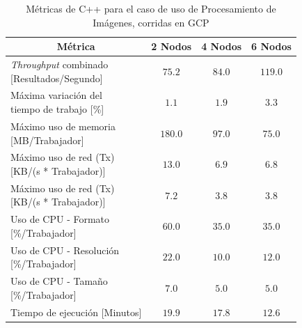 \documentclass[11pt]{article}
\providecommand{\row}[1]{\parbox{150pt}{\setlength{\baselineskip}{0.2\baselineskip}\strut#1\strut}}
\newcommand{\ipcap}[2]{\caption{Métricas de #1 para el caso de uso de Procesamiento de Imágenes, corridas en #2}}
\newcommand{\english}[1]{\textit{#1}}
\begin{document}
\begin{table}[H]
\centering
\begin{tabular}{|l|c|c|c|}
\hline
\multicolumn{1}{|c|}{Métrica} & 2 Nodos & 4 Nodos & 6 Nodos \\ \hline
\row{\english{Throughput} combinado\\{[Resultados/Segundo]}} & $75.2$ & $84.0$ & $119.0$ \\ \hline
\row{Máxima variación del \\ tiempo de trabajo {[}\%{]}} & $1.1$ & $1.9$ & $3.3$ \\ \hline
\row{Máximo uso de memoria \\ {[MB/Trabajador]}} & $180.0$ & $97.0$ & $75.0$ \\ \hline
\row{Máximo uso de red (Tx) \\ {[KB/(s * Trabajador)]}} & $13.0$ & $6.9$ & $6.8$ \\ \hline
\row{Máximo uso de red (Tx) \\ {[KB/(s * Trabajador)]}} & $7.2$ & $3.8$ & $3.8$ \\ \hline
\row{Uso de CPU - Formato\\{[\%/Trabajador]}} & $60.0$ & $35.0$ & $35.0$ \\ \hline
\row{Uso de CPU - Resolución\\{[\%/Trabajador]}} & $22.0$ & $10.0$ & $12.0$ \\ \hline
\row{Uso de CPU - Tamaño\\{[\%/Trabajador]}} & $7.0$ & $5.0$ & $5.0$ \\ \hline
Tiempo de ejecución [Minutos] & $19.9$ & $17.8$ & $12.6$ \\ \hline
\end{tabular}
\ipcap{C++}{GCP}
\end{table}
\end{document}
